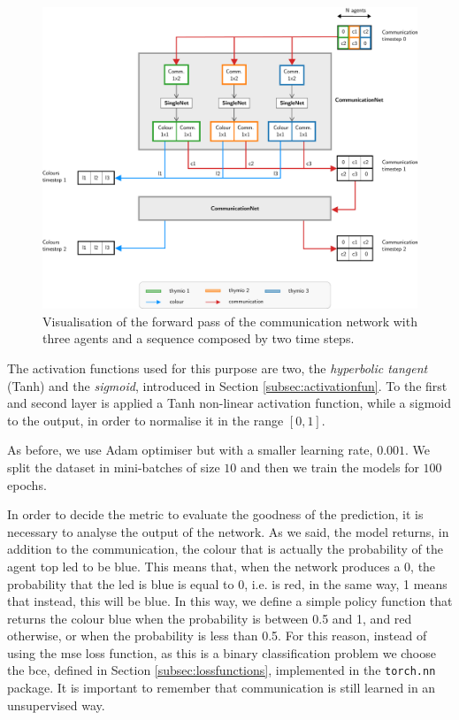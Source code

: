 \begin{figure}[!htb]
	\centering
	\includegraphics[width=\textwidth]{contents/images/commnettask2}
	\caption[Communication network of the second task.]{Visualisation of the 
		forward pass of the communication network with three agents and a 
		sequence 
		composed by two time steps.}
	\label{fig:commnet2}
\end{figure}

The activation functions used for this purpose are two,  the \emph{hyperbolic 
tangent} (Tanh) and the \emph{sigmoid}, introduced in Section 
\ref{subsec:activationfun}.
To the first and second layer is applied a Tanh non-linear activation function, 
while a sigmoid to the output, in order to normalise it in the range $[0, 1]$.


As before, we use Adam optimiser but with a smaller learning rate, $0.001$. 
We split the dataset in mini-batches of size $10$ and then we train the models for 
$100$ epochs. 

In order to decide the metric to evaluate the goodness of the prediction, it is 
necessary to analyse the output of the network. As we said, the model returns, in 
addition to the communication, the colour that is actually the probability of the 
agent top \gls{led} to be blue. This means that, when the network produces a 0, 
the probability that the \gls{led} is blue is equal to 0, i.e. is red, in the same way, 1 
means that instead, this will be blue. In this way, we define a simple policy 
function that returns the colour blue when the probability is between 0.5 and 1, 
and red otherwise, or when the probability is less than 0.5.
For this reason, instead of using the \gls{mse} loss function, as this is a binary 
classification problem we choose the \gls{bce}, defined in Section 
\ref{subsec:lossfunctions}, implemented in the \texttt{torch.nn} package.
It is important to remember that communication is still learned in an unsupervised 
way.

